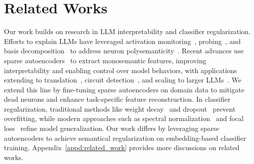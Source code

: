 \section{Related Works}
Our work builds on research in LLM interpretability and classifier regularization. Efforts to explain LLMs have leveraged activation monitoring~\citep{wang2023label}, probing~\citep{belinkov2018evaluating,jawahar2019does,rogers2021primer}, and basis decomposition~\citep{elhage2022toy,olah2020zoom} to address neuron polysemanticity~\cite{arora2018linear}. Recent advances use sparse autoencoders~\citep{brickentowards,cunningham2023sparse} to extract monosemantic features, improving interpretability and enabling control over model behaviors, with applications extending to translation~\citep{dumas2024llamas}, circuit detection~\citep{marks2024sparse}, and scaling to larger LLMs~\citep{templeton2024scaling,gao2024scaling,lieberum2024gemma}. We extend this line by fine-tuning sparse autoencoders on domain data to mitigate dead neurons and enhance task-specific feature reconstruction. In classifier regularization, traditional methods like weight decay~\citep{hoerl1970ridge} and dropout~\citep{srivastava2014dropout} prevent overfitting, while modern approaches such as spectral normalization~\citep{yoshida2017spectral} and focal loss~\citep{ross2017focal} refine model generalization. Our work differs by leveraging sparse autoencoders to achieve semantical regularization on embedding-based classifier training. 
Appendix~\ref{appd:related_work} provides more discussions on related works.